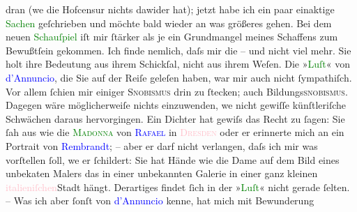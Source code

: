                dran (we{\geminationn} die Hofcensur nichts dawider hat); jetzt habe
               ich ein paar einaktige \textcolor{green}{Sachen}{}
               geſchrieben und möchte bald wieder an was größeres gehen. Bei dem neuen \textcolor{green}{Schauſpiel}{} iſt mir ſtärker als je
               ein Grundmangel {\pb}meines Schaffens zum Bewußtſein
               gekommen. Ich finde nemlich, daſs mir die \label{K_L00787_3v}\label{K_L00787_3h} – und nicht viel mehr.
               Sie holt ihre Bedeutung aus ihrem Schickſal, nicht aus ihrem Weſen.\pend
           \pstart
           Die »\textcolor{green}{Luſt}{}\ledrightnote{\textcolor{green}{Lust}}« von \textcolor{blue}{d’Annuncio}{}\ledrightnote{\textcolor{blue}{Gabriele D’Annunzio}}, die Sie auf der Reiſe geleſen haben, war mir auch nicht
               ſympathiſch. Vor allem ſchien mir einiger \textsc{Snobismus}{ }{\pb}drin zu ſtecken; auch Bildungs\textsc{snobismus}. Dagegen wäre möglicherweiſe nichts einzuwenden,
                  we{\geminationn} nicht gewiſſe künſtleriſche Schwächen daraus
               hervorgingen. Ein Dichter hat gewiſs das Recht zu ſagen: Sie ſah aus wie die \textcolor{green}{\textsc{Madonna}}{}\ledrightnote{\textcolor{green}{Sixtinische Madonna}} von \textcolor{blue}{\textsc{Rafael}}{}\ledrightnote{\textcolor{blue}{Raffaello Sanzio da Urbino}} in \textcolor{pink}{\textsc{Dresden}}{}\ledrightnote{\textcolor{pink}{Dresden}} oder er erinnerte mich an ein Portrait von \textcolor{blue}{Rembrandt}{}\ledrightnote{\textcolor{blue}{Rembrandt van Rijn}}; – aber er darf nicht verlangen, daſs ich mir was vorſtellen ſoll,
                  we{\geminationn} er ſchildert: Sie hat Hände wie die {\pb}Dame auf dem Bild eines unbeka{\geminationn}ten Malers das in einer unbekannten Galerie in einer
               ganz kleinen \textcolor{pink}{italieniſchen}{}\ledrightnote{\textcolor{pink}{Italien}}{ }Stadt hängt. Derartiges findet ſich in der »\textcolor{green}{Luſt}{}\ledrightnote{\textcolor{green}{Lust}}« nicht gerade ſelten. – Was ich aber ſonſt von
                  \textcolor{blue}{d’Annuncio}{}\ledrightnote{\textcolor{blue}{Gabriele D’Annunzio}} kenne, hat mich mit Bewunderung
